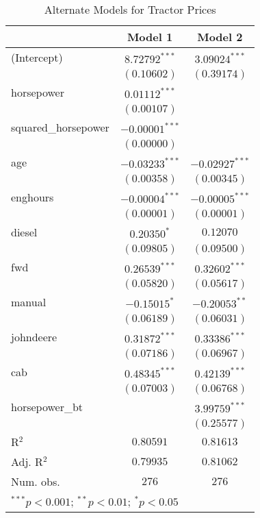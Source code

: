 
\begin{table}
\begin{center}
\begin{tabular}{l c c}
\hline
 & Model 1 & Model 2 \\
\hline
(Intercept)         & $8.72792^{***}$  & $3.09024^{***}$  \\
                    & $(0.10602)$      & $(0.39174)$      \\
horsepower          & $0.01112^{***}$  &                  \\
                    & $(0.00107)$      &                  \\
squared\_horsepower & $-0.00001^{***}$ &                  \\
                    & $(0.00000)$      &                  \\
age                 & $-0.03233^{***}$ & $-0.02927^{***}$ \\
                    & $(0.00358)$      & $(0.00345)$      \\
enghours            & $-0.00004^{***}$ & $-0.00005^{***}$ \\
                    & $(0.00001)$      & $(0.00001)$      \\
diesel              & $0.20350^{*}$    & $0.12070$        \\
                    & $(0.09805)$      & $(0.09500)$      \\
fwd                 & $0.26539^{***}$  & $0.32602^{***}$  \\
                    & $(0.05820)$      & $(0.05617)$      \\
manual              & $-0.15015^{*}$   & $-0.20053^{**}$  \\
                    & $(0.06189)$      & $(0.06031)$      \\
johndeere           & $0.31872^{***}$  & $0.33386^{***}$  \\
                    & $(0.07186)$      & $(0.06967)$      \\
cab                 & $0.48345^{***}$  & $0.42139^{***}$  \\
                    & $(0.07003)$      & $(0.06768)$      \\
horsepower\_bt      &                  & $3.99759^{***}$  \\
                    &                  & $(0.25577)$      \\
\hline
R$^2$               & $0.80591$        & $0.81613$        \\
Adj. R$^2$          & $0.79935$        & $0.81062$        \\
Num. obs.           & $276$            & $276$            \\
\hline
\multicolumn{3}{l}{\scriptsize{$^{***}p<0.001$; $^{**}p<0.01$; $^{*}p<0.05$}}
\end{tabular}
\caption{Alternate Models for Tractor Prices}
\label{tab:reg_sq_horse_bt}
\end{center}
\end{table}
